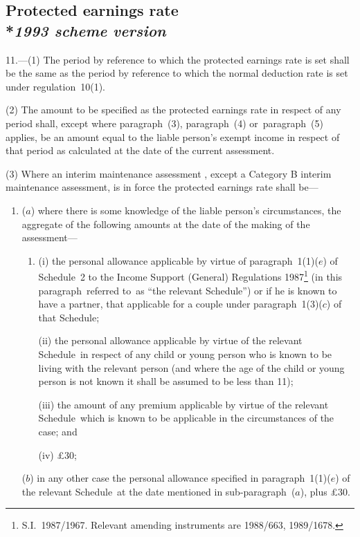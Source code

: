 \documentclass[12pt,a4paper]{article}
\begin{document}

\subsection[11. Protected earnings rate --- \emph{1993 scheme version}]{Protected earnings rate\\*\emph{1993 scheme version}}

11.—(1) The period by reference to which the protected earnings rate is set shall be the same as the period by reference to which the normal deduction rate is set under regulation~10(1).

(2) The amount to be specified as the protected earnings rate in respect of any period shall, except where 
paragraph~(3), paragraph~(4) or~paragraph~(5)  %
applies,  %
be an amount equal to the liable person’s exempt income in respect of that period as calculated at the date of the current assessment.

(3) Where an interim maintenance assessment%
, except a Category B interim maintenance assessment,  %
is in force the protected earnings rate shall be—
\begin{enumerate}\item[]
($a$) where there is some knowledge of the liable person’s circumstances, the aggregate of the following amounts at the date of the making of the assessment—
\begin{enumerate}\item[]
(i) the personal allowance applicable by virtue of paragraph~1(1)($e$) of Schedule~2 to the Income Support (General) Regulations 1987\footnote{\frenchspacing S.I.~1987/1967. Relevant amending instruments are 1988/663, 1989/1678.} (in this paragraph~referred to~as “the relevant Schedule”) or if he is known to have a partner, that applicable for a couple under paragraph~1(3)($c$) of that Schedule;

(ii) the personal allowance applicable by virtue of the relevant Schedule~in respect of any child or young person who is known to be living with the relevant person (and where the age of the child or young person is not known it shall be assumed to be less than 11);

(iii) the amount of any premium applicable by virtue of the relevant Schedule~which is known to be applicable in the circumstances of the case; and

(iv) £30;
\end{enumerate}

($b$) in any other case the personal allowance specified in paragraph~1(1)($e$) of the relevant Schedule~at the date mentioned in sub-\hspace{0pt}paragraph~($a$), plus £30.
\end{enumerate}
\end{document}
